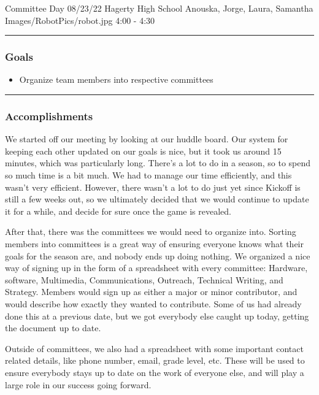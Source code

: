 \insertmeeting 
	{Committee Day} 
	{08/23/22}
	{Hagerty High School}
	{Anouska, Jorge, Laura, Samantha}
	{Images/RobotPics/robot.jpg}
	{4:00 - 4:30}
	
\noindent\hfil\rule{\textwidth}{.4pt}\hfil
\subsubsection*{Goals}
\begin{itemize}
    \item Organize team members into respective committees

\end{itemize} 

\noindent\hfil\rule{\textwidth}{.4pt}\hfil

\subsubsection*{Accomplishments}
We started off our meeting by looking at our huddle board. Our system for keeping each other updated on our goals is nice, but it took us around 15 minutes, which was particularly long. There's a lot to do in a season, so to spend so much time is a bit much. We had to manage our time efficiently, and this wasn't very efficient. However, there wasn't a lot to do just yet since Kickoff is still a few weeks out, so we ultimately decided that we would continue to update it for a while, and decide for sure once the game is revealed.

After that, there was the committees we would need to organize into. Sorting members into committees is a great way of ensuring everyone knows what their goals for the season are, and nobody ends up doing nothing. We organized a nice way of signing up in the form of a spreadsheet with every committee: Hardware, software, Multimedia, Communications, Outreach, Technical Writing, and Strategy. Members would sign up as either a major or minor contributor, and would describe how exactly they wanted to contribute. Some of us had already done this at a previous date, but we got everybody else caught up today, getting the document up to date.

Outside of committees, we also had a spreadsheet with some important contact related details, like phone number, email, grade level, etc. These will be used to ensure everybody stays up to date on the work of everyone else, and will play a large role in our success going forward.


